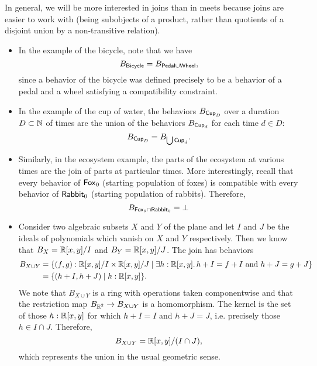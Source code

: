 In general, we will be more interested in joins than in meets because joins are easier to work with (being subobjects of a product, rather than quotients of a disjoint union by a non-transitive relation).
\begin{ex}
\begin{itemize}
    \item In the example of the bicycle, note that we have
    $$B_{\mathsf{{Bicycle}}} = B_{\mathsf{{Pedal}} \cup \mathsf{{Wheel}}},$$
    since a behavior of the bicycle was defined precisely to be a behavior of a pedal and a wheel satisfying a compatibility constraint.
    
    \item In the example of the cup of water, the behaviors $B_{\mathsf{{Cup}}_D}$ over a duration $D \subset \operatorname{\mathbb{N}}$ of times are the union of the behaviors $B_{\mathsf{{Cup}}_d}$ for each time $d \in D$:
    $$B_{\mathsf{{Cup}}_D} = B_{\bigcup \mathsf{{Cup}}_d}.$$
    
    \item Similarly, in the ecosystem example, the parts of the ecosystem at various times are the join of parts at particular times. More interestingly, recall that every behavior of $\mathsf{{Fox}}_0$ (starting population of foxes) is compatible with every behavior of $\mathsf{{Rabbit}}_0$ (starting population of rabbits). Therefore, 
    $$B_{\mathsf{{Fox}}_0 \cap \mathsf{{Rabbit}}_0} = \bot$$
    
    \item Consider two algebraic subsets $X$ and $Y$ of the plane and let $I$ and $J$ be the ideals of polynomials which vanish on $X$ and $Y$ respectively. Then we know that $B_X = \operatorname{\mathbb{R}}[x, y]/I$ and $B_Y = \operatorname{\mathbb{R}}[x, y]/J$. The join has behaviors 
    \begin{align*}
        B_{X \cup Y} &= \{(f, g) : \operatorname{\mathbb{R}}[x, y]/I \times \operatorname{\mathbb{R}}[x, y]/J \mid \exists h : \operatorname{\mathbb{R}}[x, y].\, h + I = f + I \mbox{ and } h + J = g + J\} \\
            &= \{(h + I, h + J) \mid h : \operatorname{\mathbb{R}}[x, y]\}.
    \end{align*}
    We note that $B_{X \cup Y}$ is a ring with operations taken componentwise and that the restriction map $B_{\operatorname{\mathbb{R}}^2} \to B_{X \cup Y}$ is a homomorphism. The kernel is the set of those $h : \operatorname{\mathbb{R}}[x, y]$ for which $h + I = I$ and $h + J = J$, i.e. precisely those $h \in I \cap J$. Therefore, 
    $$B_{X \cup Y} = \operatorname{\mathbb{R}}[x, y]/(I \cap J),$$
    which represents the union in the usual geometric sense.  
    
\end{itemize}
\end{ex}

